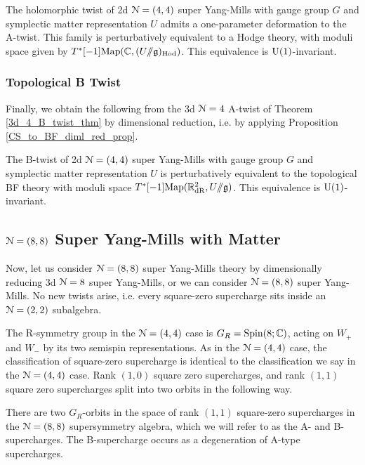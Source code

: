 \documentclass[10pt, oneside]{article}
\newcommand{\ham}{/\!\!/}
\begin{document}
\begin{theorem}
The holomorphic twist of 2d $\mathcal{N}=(4,4)$ super Yang-Mills with gauge group $G$ and symplectic matter representation $U$ admits a one-parameter deformation to the A-twist.  This family is perturbatively equivalent to a Hodge theory, with moduli space given by $T^*[-1]\mr{Map}(\CC, (U \ham \gg)_{\mr{Hod}})$.   This equivalence is $\mathrm{U}(1)$-invariant.
\end{theorem}

\subsubsection{Topological B Twist} \label{sect:2d44Btwist}
Finally, we obtain the following from the 3d $\mathcal{N}=4$ A-twist of Theorem \ref{3d_4_B_twist_thm} by dimensional reduction, i.e. by applying Proposition \ref{CS_to_BF_diml_red_prop}.

\begin{theorem}
The B-twist of 2d $\mathcal{N}=(4,4)$ super Yang-Mills with gauge group $G$ and symplectic matter representation $U$ is perturbatively equivalent to the topological BF theory with moduli space $T^*[-1]\mr{Map}(\RR^2_{\mr{dR}}, U \ham \gg)$.  This equivalence is $\mathrm{U}(1)$-invariant.
\end{theorem}

\subsection{\texorpdfstring{$\mathcal N=(8,8)$}{N=(8,8)} Super Yang-Mills with Matter} \label{sect:2d(8,8)}
Now, let us consider $\mathcal{N}=(8,8)$ super Yang-Mills theory by dimensionally reducing 3d $\mathcal{N}=8$ super Yang-Mills, or we can consider $\mathcal{N}=(8,8)$ super Yang-Mills.  No new twists arise, i.e. every square-zero supercharge sits inside an $\mathcal{N}=(2,2)$ subalgebra.

The R-symmetry group in the $\mathcal{N}=(4,4)$ case is $G_R = \mathrm{Spin}(8;\mathbb C)$, acting on $W_+$ and $W_-$ by its two semispin representations.  As in the $\mathcal{N}=(4,4)$ case, the classification of square-zero supercharge is identical to the classification we say in the $\mathcal{N}=(4,4)$ case.  Rank $(1,0)$ square zero supercharges, and rank $(1,1)$ square zero supercharges split into two orbits in the following way.

\begin{prop}
There are two $G_R$-orbits in the space of rank $(1,1)$ square-zero supercharges in the $\mathcal{N}=(8,8)$ supersymmetry algebra, which we will refer to as the A- and B-supercharges.  The B-supercharge occurs as a degeneration of A-type supercharges.
\end{prop}
\end{document}
